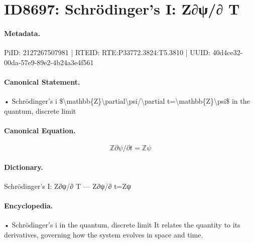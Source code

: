 \section*{ID8697: Schrödinger's I: Z∂ψ/∂ T}
\paragraph{Metadata.}
PiID: 2127267507981 | RTEID: RTE:P33772.3824:T5.3810 | UUID: 40d4ce32-00da-57e9-89e2-4b24a3e4f561

\paragraph{Canonical Statement.}
• Schrödinger's i \$\textbackslash{}mathbb\{Z\}\textbackslash{}partial\textbackslash{}psi/\textbackslash{}partial t=\textbackslash{}mathbb\{Z\}\textbackslash{}psi\$ in the quantum, discrete limit

\paragraph{Canonical Equation.}
\[
\mathbb{Z}\partial\psi/\partial t=\mathbb{Z}\psi
\]

\paragraph{Dictionary.}
Schrödinger's I: Z∂ψ/∂ T — Z∂ψ/∂ t=Zψ

\paragraph{Encyclopedia.}
• Schrödinger's i in the quantum, discrete limit It relates the quantity to its derivatives, governing how the system evolves in space and time.
